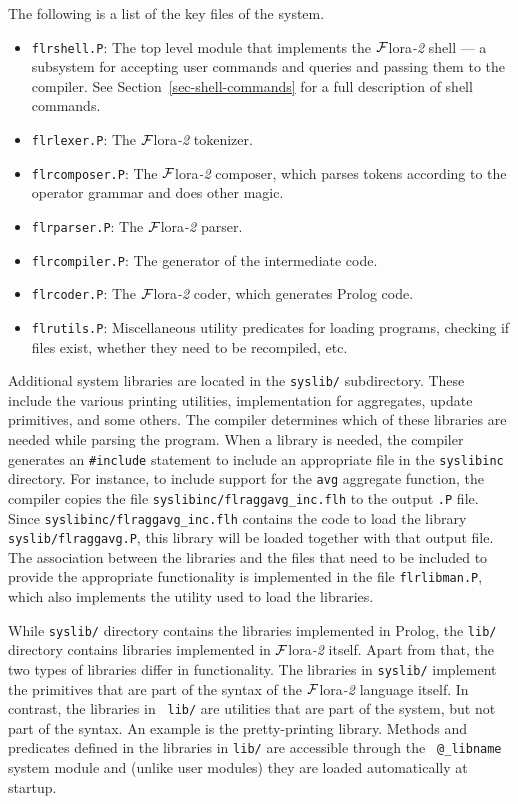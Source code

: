 \documentclass[11pt]{article}
\newcommand{\FLORA}{{\mbox{\sc ${\cal F}${lora}\rm\emph{-2}}}\xspace}
\begin{document}
The following is a list of the key files of the system.
\begin{itemize}
\item \texttt{flrshell.P}: The top level module that implements the
  \FLORA shell --- a subsystem for accepting user commands and queries and
  passing them to the compiler.  See Section~\ref{sec-shell-commands} for a
  full description of shell commands.
\item \texttt{flrlexer.P}: The \FLORA tokenizer.
\item \texttt{flrcomposer.P}: The \FLORA composer, which parses tokens
  according to the operator grammar and does other magic.
\item \texttt{flrparser.P}: The \FLORA parser.
\item \texttt{flrcompiler.P}: The generator of the intermediate code.
\item \texttt{flrcoder.P}: The \FLORA coder, which generates Prolog code.
\item \texttt{flrutils.P}: Miscellaneous utility predicates for loading
  programs, checking if files exist, whether they need to be recompiled,
  etc.
\end{itemize}
Additional system libraries are located in the {\tt syslib/} subdirectory.
These include the various printing utilities, implementation for
aggregates, update primitives, and some others. The compiler determines
which of these libraries are needed while parsing the program. When a
library is needed, the compiler generates an {\tt \#include} statement to
include an appropriate file in the {\tt syslibinc} directory. For instance,
to include support for the {\tt avg} aggregate function, the compiler
copies the file {\tt syslibinc/flraggavg\_inc.flh} to the output {\tt .P}
file.  Since {\tt syslibinc/flraggavg\_inc.flh} contains the code to load
the library {\tt syslib/flraggavg.P}, this library will be loaded together
with that output file. The association between the libraries and the files
that need to be included to provide the appropriate functionality is
implemented in the file {\tt flrlibman.P}, which also implements the
utility used to load the libraries.

While {\tt syslib/} directory contains the libraries implemented in Prolog,
the {\tt lib/} directory contains libraries implemented in \FLORA itself.
Apart from that, the two types of libraries differ in functionality.  The
libraries in {\tt syslib/} implement the primitives that are part of the
syntax of the \FLORA language itself. In contrast, the libraries in {\tt
  lib/} are utilities that are part of the system, but not part of the
syntax. An example is the pretty-printing library.  Methods and predicates
defined in the libraries in {\tt lib/} are accessible through the {\tt
  @\_libname} system module and (unlike user modules) they are loaded
automatically at startup.
\end{document}
